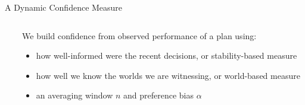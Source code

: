 \documentclass[10pt]{beamer}
\renewcommand\example[1]{{\color{black!50!green}#1}}
\begin{document}
\begin{frame}{A Dynamic Confidence Measure}

\begin{columns}
\begin{column}[l]{0.4\textwidth}
\begin{overlayarea}{\textwidth}{5cm} 
\resizebox{\textwidth}{!}{

}
\end{overlayarea}
\end{column}
\begin{column}[l]{0.6\textwidth}
\begin{overlayarea}{\textwidth}{5cm} 
We build confidence from \alert{observed performance} of a plan using:
\pause
\begin{itemize}
\item<+-> \example{how well-informed were the recent decisions}, or \alert{stability-based} measure
\item<+-> \example{how well we know the worlds we are witnessing}, or \alert{world-based} measure
\item<+-> an averaging window $n$ and preference bias $\alpha$ \\~\\~\\
\end{itemize}
\end{overlayarea}
\end{column}
\end{columns}
\vskip -1cm
\end{frame}
\end{document}
